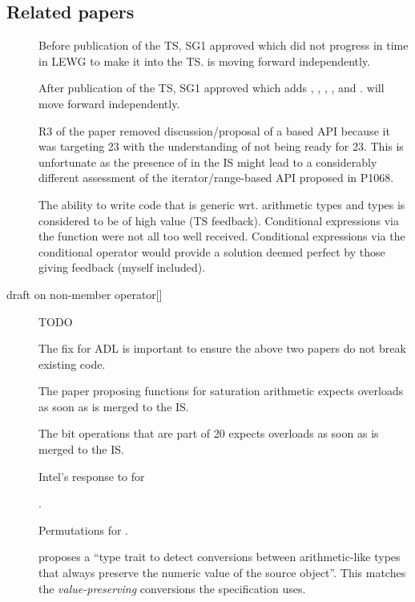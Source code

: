\subsection{Related papers}
\begin{description}
  \item[] Before publication of the TS, SG1 approved \cite{P0350R0} which did not progress in time in LEWG to make it into the TS.
     is moving forward independently.

  \item[] After publication of the TS, SG1 approved \cite{P0918R2} which adds , , , , and .
     will move forward independently.

  \item[] R3 of the paper removed discussion/proposal of a  based API because it was targeting \CC{}23 with the understanding of  not being ready for \CC{}23.
    This is unfortunate as the presence of  in the IS might lead to a considerably different assessment of the iterator/range-based API proposed in P1068.

  \item[] The ability to write code that is generic wrt. arithmetic types and  types is considered to be of high value (TS feedback).
    Conditional expressions via the  function were not all too well received.
    Conditional expressions via the conditional operator would provide a solution deemed perfect by those giving feedback (myself included).

  \item[draft on non-member {operator[]}] TODO

  \item[] The fix for ADL is important to ensure the above two papers do not break existing code.

  \item[] The paper proposing functions for saturation arithmetic expects  overloads as soon as  is merged to the IS.

  \item[] The bit operations that are part of \CC{}20 expects  overloads as soon as  is merged to the IS.

  \item[] Intel’s response to  for 

  \item[] .

  \item[] Permutations for .

  \item[] \textcite{P2509R0} proposes a ``type trait to detect
    conversions between arithmetic-like types that always preserve the numeric
    value of the source object''. This matches the \textit{value-preserving}
    conversions the  specification uses.
\end{description}
